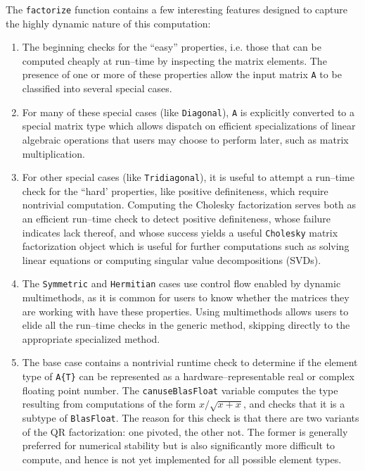 \documentclass[pldi]{sigplanconf-pldi15}
\begin{document}
The \verb|factorize| function contains a few interesting features
designed to capture the highly dynamic nature of this computation:

\begin{enumerate}
\item The beginning checks for the ``easy'' properties, i.e.  those that can be
	computed cheaply at run--time by inspecting the matrix elements. The
	presence of one or more of these properties allow the input matrix
	\verb|A| to be classified into several special cases.

\item For many of these special cases (like \verb|Diagonal|), \verb|A| is
	explicitly converted to a special matrix type which allows dispatch on
	efficient specializations of linear algebraic operations that users may
	choose to perform later, such as matrix multiplication.
	
\item For other special cases (like \verb|Tridiagonal|), it is useful to
	attempt a run--time check for the ``hard' properties, like positive
	definiteness, which require nontrivial computation. Computing the
	Cholesky factorization serves both as an efficient run--time check to
	detect positive definiteness, whose failure indicates lack thereof, and
	whose success yields a useful \verb|Cholesky| matrix factorization
	object which is useful for further computations such as solving linear
	equations or computing singular value decompositions (SVDs).

\item The \verb|Symmetric| and \verb|Hermitian| cases use control flow
	enabled by dynamic multimethods, as it is common for users to know
	whether the matrices they are working with have these properties.
	Using multimethods allows users to elide all the run--time checks
	in the generic method, skipping directly to the appropriate specialized
	method.

\item The base case contains a nontrivial runtime check to determine if the
	element type of \verb|A{T}| can be represented as a
	hardware--representable real or complex floating point number. The
	\verb|canuseBlasFloat| variable computes the type resulting from
	computations of the form $x / \sqrt{x + x}$, and checks that it is a
	subtype of \verb|BlasFloat|. The reason for this check is that there
	are two variants of the QR factorization: one pivoted, the other not.
	The former is generally preferred for numerical stability but is also
	significantly more difficult to compute, and hence is not yet
	implemented for all possible element types.

\end{enumerate}
\end{document}
